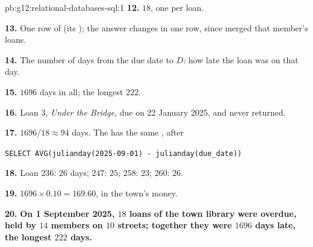 \begin{solution}{pb:g12:relational-databases-sql:1}
\textbf{12.} $18$, one per loan.

\textbf{13.} One row of  (its ); the answer changes in one row, since 
merged that member's loans.

\textbf{14.} The number of days from the due date to $D$: how late the loan was on that day.

\textbf{15.} $1696$ days in all; the longest $222$.

\textbf{16.} Loan $3$, \emph{Under the Bridge}, due on 22 January 2025, and never returned.

\textbf{17.} $1696 / 18 \approx 94$ days. The  has the same , after

\smallskip\noindent\hspace*{2em}\texttt{SELECT AVG(julianday(\textquotesingle{}2025-09-01\textquotesingle{}) - julianday(due\_date))}

\noindent\hspace*{2em}

\smallskip

\textbf{18.} Loan $236$: $26$ days; $247$: $25$; $258$: $23$; $260$: $26$.

\textbf{19.} $1696 \times 0.10 = 169.60$, in the town's money.

\textbf{20.} \textbf{On 1 September 2025, $18$ loans of the town library were overdue, held by $14$ members on $10$
streets; together they were $1696$ days late, the longest $222$ days.}
\end{solution}
